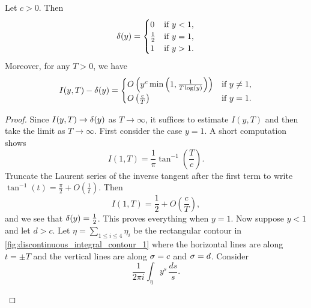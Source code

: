\documentclass[12pt]{article}
\begin{document}
    \begin{lemma}\label{lem:delta_truncation_estimate}
      Let \(c > 0\). Then
      \[
        \delta(y) = \begin{cases} 0 & \text{if \(y < 1\)}, \\ \frac{1}{2} & \text{if \(y = 1\)}, \\ 1 & \text{if \(y > 1\)}. \end{cases}
      \]
      Moreover, for any \(T > 0\), we have
      \[
        I(y,T)-\delta(y) = \begin{cases} O\left(y^{c}\min\left(1,\frac{1}{T\log(y)}\right)\right) & \text{if \(y \neq 1\)}, \\ O\left(\frac{c}{T}\right) & \text{if \(y = 1\)}. \end{cases}
      \]
    \end{lemma}
    \begin{proof}
      Since \(I(y,T) \to \delta(y)\) as \(T \to \infty\), it suffices to estimate \(I(y,T)\) and then take the limit as \(T \to \infty\). First consider the case \(y = 1\). A short computation shows
      \[
        I(1,T) = \frac{1}{\pi}\tan^{-1}\left(\frac{T}{c}\right).
      \]
      Truncate the Laurent series of the inverse tangent after the first term  to write \(\tan^{-1}(t) = \frac{\pi}{2}+O\left(\frac{1}{t}\right)\). Then
      \[
        I(1,T) = \frac{1}{2}+O\left(\frac{c}{T}\right),
      \] 
      and we see that \(\delta(y) = \frac{1}{2}\). This proves everything when \(y = 1\). Now suppose \(y < 1\) and let \(d > c\). Let \(\eta = \sum_{1 \le i \le 4}\eta_{i}\) be the rectangular contour in \cref{fig:discontinuous_integral_contour_1} where the horizontal lines are along \(t = \pm T\) and the vertical lines are along \(\sigma = c\) and \(\sigma = d\). Consider
      \[
        \frac{1}{2\pi i}\int_{\eta}y^{s}\,\frac{ds}{s}.
      \]

      \begin{figure}[ht]
        \centering
\end{figure}
\end{proof}
\end{document}
